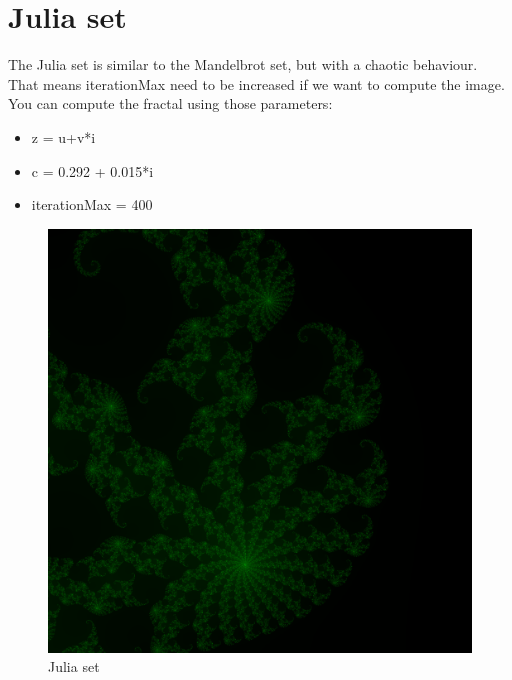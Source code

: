 \documentclass{article}
\begin{document}
\section{Julia set}
The Julia set is similar to the Mandelbrot set, but with a chaotic behaviour. That means iterationMax need to be increased if we want to compute the image. You can compute the fractal using those parameters:
\begin{itemize}
	\item z = u+v*i
	\item c = 0.292 + 0.015*i
	\item iterationMax = 400
\end{itemize}
\begin{figure}[H]
	\centering
	\includegraphics[scale=0.4]{figures/julia.png}
	\caption{Julia set}
\end{figure}
\end{document}
